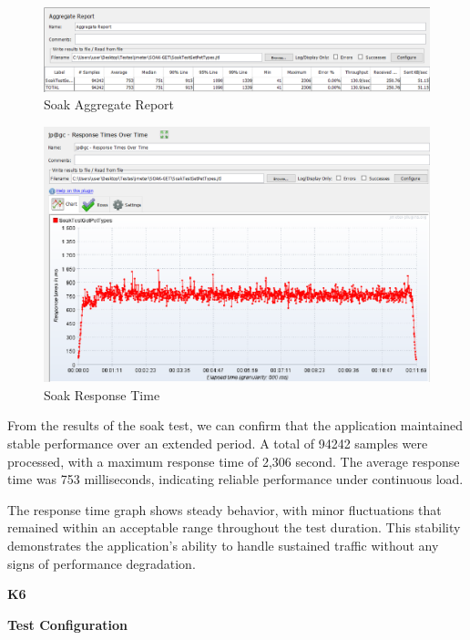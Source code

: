 \documentclass[a4paper,11pt,openright,BCOR=15mm]{scrbook}
\begin{document}
\begin{figure}[H]
	\centering
	\includegraphics[width=\textwidth]{figs/Performance/jmeter/SoakGetAgregateResult.png}
	\caption{Soak Aggregate Report}
	\label{fig:SoakAggregatejMeter}
\end{figure}

\begin{figure}[H]
	\centering
	\includegraphics[width=\textwidth]{figs/Performance/jmeter/SoakGetResponsesOverTime.png}
	\caption{Soak Response Time}
	\label{fig:SoakResponsejMeter}
\end{figure}

From the results of the soak test, we can confirm that the application maintained stable performance over an extended period. A total of 94242 samples were processed, with a maximum response time of 2,306 second. The average response time was 753 milliseconds, indicating reliable performance under continuous load.

The response time graph shows steady behavior, with minor fluctuations that remained within an acceptable range throughout the test duration. This stability demonstrates the application's ability to handle sustained traffic without any signs of performance degradation.

\textbf{K6}



\textbf{Test Configuration}
\end{document}
